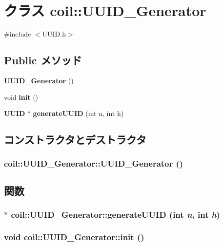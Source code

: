 \section{クラス coil::UUID\_\-Generator}
\label{classcoil_1_1UUID__Generator}


{\ttfamily \#include $<$UUID.h$>$}

\subsection*{Public メソッド}
\begin{DoxyCompactItemize}
\item 
{\bf UUID\_\-Generator} ()
\item 
void {\bf init} ()
\item 
{\bf UUID} $\ast$ {\bf generateUUID} (int n, int h)
\end{DoxyCompactItemize}


\subsection{コンストラクタとデストラクタ}
\subsubsection[{UUID\_\-Generator}]{\setlength{\rightskip}{0pt plus 5cm}coil::UUID\_\-Generator::UUID\_\-Generator ()}\label{classcoil_1_1UUID__Generator_a1d33ef6dedf0bcafa78b21a929a4e30d}


\subsection{関数}
\subsubsection[{generateUUID}]{$\ast$ coil::UUID\_\-Generator::generateUUID (int {\em n}, \/  int {\em h})}\label{classcoil_1_1UUID__Generator_a3337b868024651506659ffd21c10c2d6}
\subsubsection[{init}]{\setlength{\rightskip}{0pt plus 5cm}void coil::UUID\_\-Generator::init ()}\label{classcoil_1_1UUID__Generator_aa7530e8556288ea101c23e0fd17e53d1}

